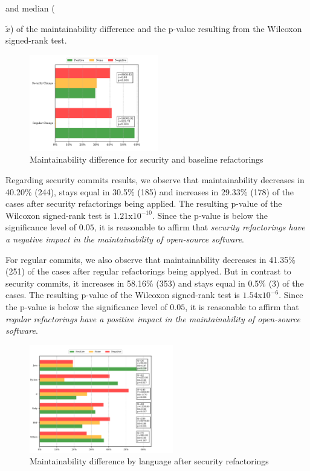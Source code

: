 \documentclass[10pt,conference]{IEEEtran}
\begin{document}
and median ({$\widetilde{x}$) of the maintainability difference and the p-value
resulting from the Wilcoxon signed-rank test.

\begin{figure}[h]
 	\centering 	\includegraphics[width=0.5\textwidth]{figures/maintainability.pdf}
 	\caption{Maintainability difference for security and baseline refactorings}
	\label{fig:secvsreg}
\end{figure}

Regarding security commits results, we observe that maintainability decreases
in 40.20\% (244), stays equal in 30.5\% (185) and increases in 29.33\% (178)
of the cases after security refactorings being applied. The resulting p-value
of the Wilcoxon signed-rank test is $1.21$x$10^{-10}$. Since the p-value is below
the significance level of $0.05$, it is reasonable to affirm that \emph{security
refactorings have a negative impact in the maintainability of open-source software}.

For regular commits, we also observe that maintainability decreases in 41.35\%
(251) of the cases after regular refactorings being applyed. But in contrast
to security commits, it increases in 58.16\% (353) and stays equal in 0.5\%
(3) of the cases. The resulting p-value of the Wilcoxon signed-rank test is
$1.54$x$10^{-6}$. Since the p-value is below the significance level of $0.05$,
it is reasonable to affirm that \emph{regular refactorings have a positive
impact in the maintainability of open-source software}.

\begin{figure}[h]
 	\centering
 	\includegraphics[width=0.56\textwidth]{figures/language.pdf}
 	\caption{Maintainability difference by language after security refactorings}
	\label{fig:lang_main}
\end{figure}

}
\end{document}
